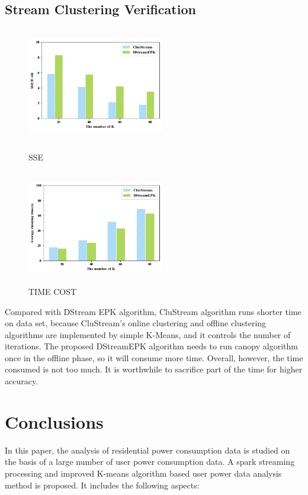 \documentclass[runningheads]{llncs}
\begin{document}
\subsection{Stream Clustering Verification }
\begin{figure}
	\begin{minipage}[t]{0.5\linewidth}
		\includegraphics[height=5cm,width=6cm]{SSE.png}
		\caption{SSE} \label{SSE}
	\end{minipage}%
	\begin{minipage}[t]{0.5\linewidth}
		\includegraphics[height=5cm,width=6cm]{time.png}
		\caption{TIME COST} \label{time}
	\end{minipage}
\end{figure}
Compared with DStream EPK algorithm, CluStream algorithm runs shorter time on data set, because CluStream's online clustering and offline clustering algorithms are implemented by simple K-Means, and it controls the number of iterations. The proposed DStreamEPK algorithm needs to run canopy algorithm once in the offline phase, so it will consume more time. Overall, however, the time consumed is not too much. It is worthwhile to sacrifice part of the time for higher accuracy.


\section{Conclusions}
In this paper, the analysis of residential power consumption data is studied on the basis of a large number of user power consumption data.            
A spark streaming processing and improved K-means algorithm based user power data analysis method is proposed. 
It includes the following aspects:            
\end{document}
